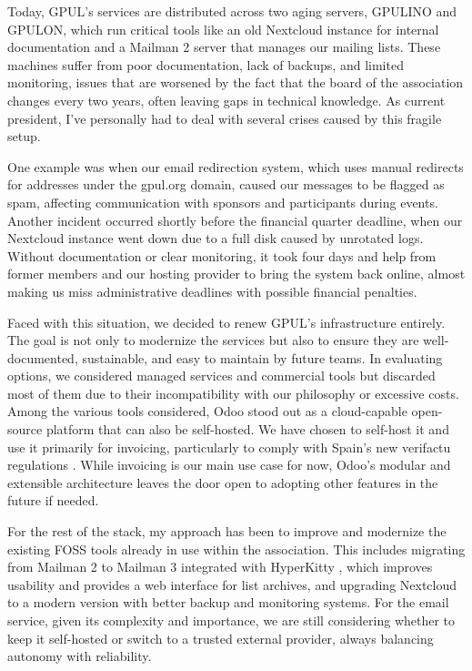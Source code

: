 Today, GPUL's services are distributed across two aging servers, GPULINO and GPULON, which run critical tools like an old Nextcloud instance for internal documentation and a Mailman 2 server that manages our mailing lists. These machines suffer from poor documentation, lack of backups, and limited monitoring, issues that are worsened by the fact that the board of the association changes every two years, often leaving gaps in technical knowledge. As current president, I've personally had to deal with several crises caused by this fragile setup.

One example was when our email redirection system, which uses manual redirects for addresses under the gpul.org domain, caused our messages to be flagged as spam, affecting communication with sponsors and participants during events. Another incident occurred shortly before the financial quarter deadline, when our Nextcloud instance went down due to a full disk caused by unrotated logs. Without documentation or clear monitoring, it took four days and help from former members and our hosting provider to bring the system back online, almost making us miss administrative deadlines with possible financial penalties.

Faced with this situation, we decided to renew GPUL's infrastructure entirely. The goal is not only to modernize the services but also to ensure they are well-documented, sustainable, and easy to maintain by future teams. In evaluating options, we considered managed services and commercial tools but discarded most of them due to their incompatibility with our philosophy or excessive costs. Among the various tools considered, Odoo \cite{odoo_web} stood out as a cloud-capable open-source platform that can also be self-hosted. We have chosen to self-host it and use it primarily for invoicing, particularly to comply with Spain's new \gls{verifactu} regulations \cite{BOE-A-2024-22138}. While invoicing is our main use case for now, Odoo's modular and extensible architecture leaves the door open to adopting other features in the future if needed.

For the rest of the stack, my approach has been to improve and modernize the existing FOSS tools already in use within the association. This includes migrating from Mailman 2 to Mailman 3 integrated with HyperKitty \cite{hyperkitty_web}, which improves usability and provides a web interface for list archives, and upgrading Nextcloud to a modern version with better backup and monitoring systems. For the email service, given its complexity and importance, we are still considering whether to keep it self-hosted or switch to a trusted external provider, always balancing autonomy with reliability.

